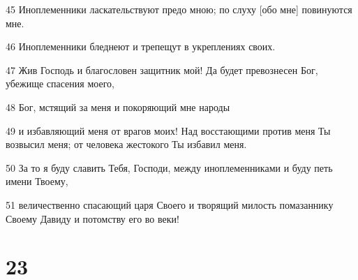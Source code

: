 \par 45 Иноплеменники ласкательствуют предо мною; по слуху [обо мне] повинуются мне.
\par 46 Иноплеменники бледнеют и трепещут в укреплениях своих.
\par 47 Жив Господь и благословен защитник мой! Да будет превознесен Бог, убежище спасения моего,
\par 48 Бог, мстящий за меня и покоряющий мне народы
\par 49 и избавляющий меня от врагов моих! Над восстающими против меня Ты возвысил меня; от человека жестокого Ты избавил меня.
\par 50 За то я буду славить Тебя, Господи, между иноплеменниками и буду петь имени Твоему,
\par 51 величественно спасающий царя Своего и творящий милость помазаннику Своему Давиду и потомству его во веки!

\chapter{23}

